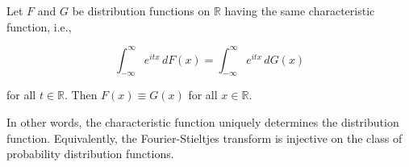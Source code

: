 Let $F$ and $G$ be distribution functions on $\mathbb{R}$ having the same characteristic function, i.e.,

$$\int_{-\infty}^{\infty} e^{itx} \, dF(x) = \int_{-\infty}^{\infty} e^{itx} \, dG(x)$$

for all $t \in \mathbb{R}$. Then $F(x) \equiv G(x)$ for all $x \in \mathbb{R}$.

In other words, the characteristic function uniquely determines the distribution function. Equivalently, the Fourier-Stieltjes transform is injective on the class of probability distribution functions.
